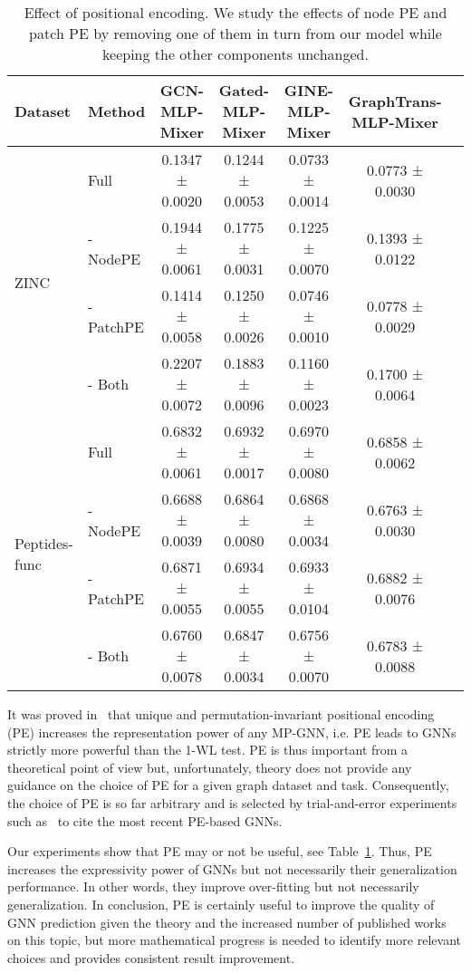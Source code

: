 \documentclass{article}
\begin{document}
\begin{table}[!ht]
    \centering
    \small
    \caption{Effect of positional encoding. We study the effects of node PE and patch PE by removing one of them in turn from our model while keeping the other components unchanged.}
    \label{tab: node PE and patch PE}
    \begin{tabular}{llccccc}
    \toprule
    Dataset &Method&  GCN-MLP-Mixer & Gated-MLP-Mixer & GINE-MLP-Mixer & GraphTrans-MLP-Mixer\\
         \midrule
    \multirow{4}{*}{ZINC}
    & Full     
    & 0.1347 ± 0.0020	
    & 0.1244 ± 0.0053 
    & 0.0733 ± 0.0014 
    & 0.0773 ± 0.0030\\
    & - NodePE
    & 0.1944 ± 0.0061	
    & 0.1775 ± 0.0031
    & 0.1225 ± 0.0070	
    & 0.1393 ± 0.0122\\
    & - PatchPE
    &0.1414 ± 0.0058	
    &0.1250 ± 0.0026
    &0.0746 ± 0.0010	
    &0.0778 ± 0.0029\\
    & - Both
    &0.2207 ± 0.0072
    &0.1883 ± 0.0096
    &0.1160 ± 0.0023
    &0.1700 ± 0.0064\\
    \midrule
    \multirow{4}{*}{Peptides-func}
    & Full     
    & 0.6832 ± 0.0061
    & 0.6932 ± 0.0017
    & 0.6970 ± 0.0080		
    & 0.6858 ± 0.0062\\
    & - NodePE
    & 0.6688 ± 0.0039
    & 0.6864 ± 0.0080
    & 0.6868 ± 0.0034		
    & 0.6763 ± 0.0030\\
    & - PatchPE
    & 0.6871 ± 0.0055
    & 0.6934 ± 0.0055
    & 0.6933 ± 0.0104		
    & 0.6882 ± 0.0076\\
    & - Both
    & 0.6760 ± 0.0078
    & 0.6847 ± 0.0034
    & 0.6756 ± 0.0070		
    & 0.6783 ± 0.0088\\
    \bottomrule
    \end{tabular}
\end{table}
It was proved in~\citep{murphy2019relational, Loukas2020What} that unique and permutation-invariant positional encoding (PE) increases the representation power of any MP-GNN, i.e. PE leads to GNNs strictly more powerful than the 1-WL test. PE is thus important from a theoretical point of view but, unfortunately, theory does not provide any guidance on the choice of PE for a given graph dataset and task. Consequently, the choice of PE is so far arbitrary and is selected by trial-and-error experiments such as~\citep{rampavsek2022recipe, lim2022sign} to cite the most recent PE-based GNNs. 


Our experiments show that PE may or not be useful, see Table~\ref{tab: node PE and patch PE}. Thus, PE increases the expressivity power of GNNs but not necessarily their generalization performance. In other words, they improve over-fitting but not necessarily generalization. In conclusion, PE is certainly useful to improve the quality of GNN prediction given the theory and the increased number of published works on this topic, but more mathematical progress is needed to identify more relevant choices and provides consistent result improvement.
\end{document}
